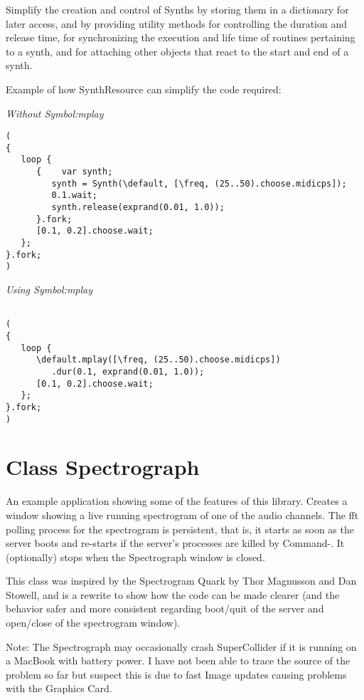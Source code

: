 \documentclass[11pt, a4paper]{scrartcl}
\begin{document}
Simplify the creation and control of Synths by storing them in a dictionary for later access, and by providing utility methods for
controlling the duration and release time, for synchronizing the execution and life time of routines pertaining to a synth, and for attaching other objects that react to the start and end of a synth.

Example of how SynthResource can simplify the code required: 

\emph{Without Symbol:mplay}

\begin{verbatim}
(
{
   loop {
      {    var synth;
         synth = Synth(\default, [\freq, (25..50).choose.midicps]);
         0.1.wait;
         synth.release(exprand(0.01, 1.0));
      }.fork;
      [0.1, 0.2].choose.wait;
   };
}.fork;
)
\end{verbatim}

\emph{Using Symbol:mplay}

\begin{verbatim}

(
{
   loop {
      \default.mplay([\freq, (25..50).choose.midicps])
         .dur(0.1, exprand(0.01, 1.0));
      [0.1, 0.2].choose.wait;
   };
}.fork;
)
\end{verbatim}
\section*{Class Spectrograph}
\label{sec-16}


An example application showing some of the features of this library. Creates a window showing a live running spectrogram of one of the audio channels. The fft polling process for the spectrogram is persistent, that is, it starts as soon as the server boots and re-starts if the server's processes are killed by Command-. It (optionally) stops when the Spectrograph window is closed. 

This class was inspired by the Spectrogram Quark by Thor Magnusson and Dan Stowell, and is a rewrite to show how the code can be made clearer (and the behavior safer and more consistent regarding boot/quit of the server and open/close of the spectrogram window). 

Note: The Spectrograph may occasionally crash SuperCollider if it is running on a MacBook with battery power. I have not been able to trace the source of the problem so far but suspect this is due to fast Image updates causing problems with the Graphics Card.
\end{document}
